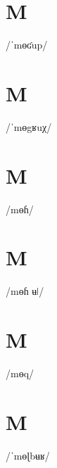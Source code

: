 \documentclass[10pt,a4paper,twoside]{book}
\begin{document}
\section*{M}

\begin{multicols}{3}
 {/ˈmɵʛup/} {}
\end{multicols}

\section*{M}

\begin{multicols}{3}
 {/ˈmɵgʁuχ/} {}
\end{multicols}

\section*{M}

\begin{multicols}{3}
 {/mɵɦ/} {}
\end{multicols}

\section*{M}

\begin{multicols}{3}
 {/mɵɦ ʉǀ/} {}
\end{multicols}

\section*{M}

\begin{multicols}{3}
 {/mɵq/} {}
\end{multicols}

\section*{M}

\begin{multicols}{3}
 {/ˈmɵɭbʉʁ/} {}
\end{multicols}
\end{document}
